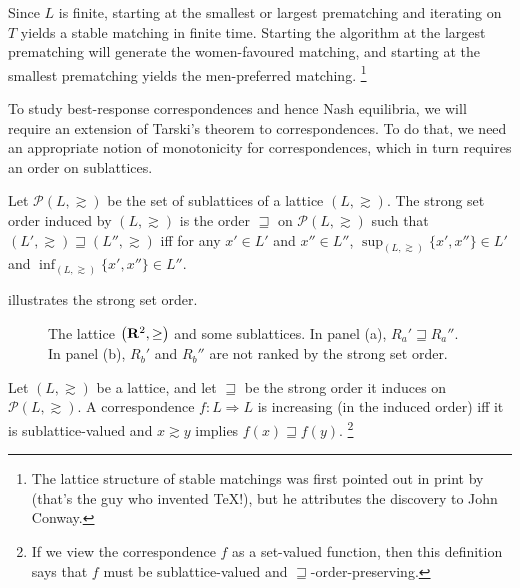 \documentclass[11pt,letterpaper,reqno,oneside]{article}
\begin{document}
\begin{example}[matching]
	Since $L$ is finite, starting at the smallest or largest prematching and iterating on $T$ yields a stable matching in finite time. Starting the algorithm at the largest prematching will generate the women-favoured matching, and starting at the smallest prematching yields the men-preferred matching.%
		\footnote{The lattice structure of stable matchings was first pointed out in print by \textcite{Knuth1976} (that's the guy who invented \TeX!), but he attributes the discovery to John Conway.}
\end{example}


To study best-response correspondences and hence Nash equilibria, we will require an extension of Tarski's theorem to correspondences. To do that, we need an appropriate notion of monotonicity for correspondences, which in turn requires an order on sublattices.
%
\begin{definition}
	Let $\mathcal{P}(L,\gtrsim)$ be the set of sublattices of a lattice $(L,\gtrsim)$. The strong set order induced by $(L,\gtrsim)$ is the order $\sqsupseteq$ on $\mathcal{P}(L,\gtrsim)$ such that $(L',\gtrsim) \sqsupseteq (L'',\gtrsim)$ iff for any $x' \in L'$ and $x'' \in L''$, $\sup_{(L,\gtrsim)}\{x',x''\} \in L'$ and $\inf_{(L,\gtrsim)}\{x',x''\} \in L''$.
\end{definition}

\noindent {} illustrates the strong set order.
%
\begin{figure}
	\begin{subfigure}{0.5\textwidth}
		\centering
		
		\caption{}
	\end{subfigure}
	\begin{subfigure}{0.5\textwidth}
		\centering
		
		\caption{}
	\end{subfigure}
	\caption{The lattice $\left(\mathbf{R}^2,\geq\right)$ and some sublattices. In panel (a), $R_a' \sqsupseteq R_a''$. In panel (b), $R_b'$ and $R_b''$ are not ranked by the strong set order.}
	\label{fig:example_strong_set_order}
\end{figure}

\begin{definition}
	Let $(L,\gtrsim)$ be a lattice, and let $\sqsupseteq$ be the strong order it induces on $\mathcal{P}(L,\gtrsim)$. A correspondence $f : L \Rightarrow L$ is increasing (in the induced order) iff it is sublattice-valued and $x \gtrsim y$ implies $f(x) \sqsupseteq f(y)$.%
		\footnote{If we view the correspondence $f$ as a set-valued function, then this definition says that $f$ must be sublattice-valued and $\sqsupseteq$-order-preserving.}
\end{definition}
\end{document}
